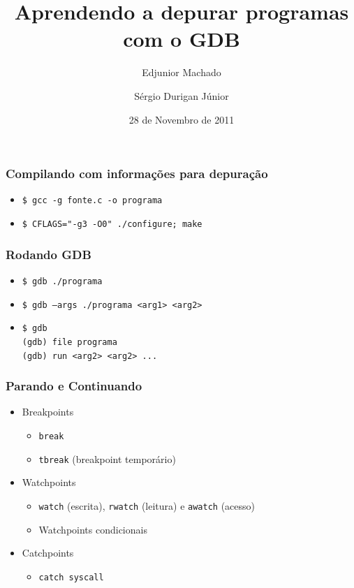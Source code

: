 \documentclass[xcolor=pdftex,dvipsnames,table,t]{beamer}
\title{Aprendendo a depurar programas com o GDB}
\author{Edjunior Machado \and
	Sérgio Durigan Júnior}
\date[Unicamp]{28 de Novembro de 2011}
\begin{document}

\begin{frame}
	\frametitle{Compilando com informações para depuração}
	  \begin{itemize}
	    \item \texttt{\$ gcc -g fonte.c -o programa}
	    \item \texttt{\$ CFLAGS="-g3 -O0" ./configure; make}
	  \end{itemize}
\end{frame}

\begin{frame}
	\frametitle{Rodando GDB}
	  \begin{itemize}
	    \item \texttt{\$ gdb ./programa}
	    \item \texttt{\$ gdb --args ./programa <arg1> <arg2>}
	    \item \texttt{\$ gdb \\
		(gdb) file programa \\
		(gdb) run <arg2> <arg2> ...}
	  \end{itemize}
\end{frame}

\begin{frame}
	\frametitle{Parando e Continuando} %
	  \begin{itemize}
	    \item Breakpoints
	      \begin{itemize}
		\item \texttt{break}
		\item \texttt{tbreak} (breakpoint temporário)
	      \end{itemize}
	    \item Watchpoints
	      \begin{itemize}
		\item \texttt{watch} (escrita), \texttt{rwatch} (leitura) e \texttt{awatch} (acesso)
		\item Watchpoints condicionais
	      \end{itemize}
	    \item Catchpoints
	      \begin{itemize}
		\item \texttt{catch syscall}
	      \end{itemize}
	  \end{itemize}
\end{frame}
\end{document}
